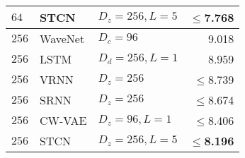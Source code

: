 {\begin{table}[t!]
\begin{tabular}{lll|r}
        $64$      & STCN                & $D_z=256,L=5$  & $\leq$\textbf{7.768} \\
        \midrule
        $256$      & WaveNet             & $D_c=96$              & 9.018 \\
        $256$      & LSTM                & $D_d=256, L=1$        & 8.959 \\  %
        $256$      & VRNN                & $D_z=256$             & $\leq$8.739 \\
        $256$      & SRNN                & $D_z=256$             & $\leq$8.674 \\
        $256$      & CW-VAE              & $D_z=96, L=1$         & $\leq$8.406 \\
        $256$      & STCN                & $D_z=256,L=5$         & $\leq$\textbf{8.196} \\
        \bottomrule
    \end{tabular}
    \label{tab: timit likelihoods dmol linear appendix}
\end{table}


}
